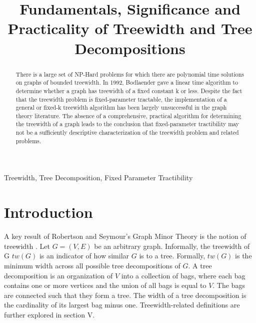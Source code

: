 \documentclass[12pt,conference]{IEEEtran}
\theoremstyle{plain}
\begin{document}
\raggedbottom

\title{Fundamentals, Significance and Practicality of Treewidth and Tree Decompositions}

\author{
}

\maketitle

\begin{abstract}
There is a large set of NP-Hard problems for which there are polynomial time solutions on graphs of bounded treewidth. In 1992, Bodlaender gave a linear time algorithm to determine whether a graph has treewidth of a fixed constant k or less. Despite the fact that the treewidth problem is fixed-parameter tractable, the implementation of a general or fixed-k treewidth algorithm has been largely unsuccessful in the graph theory literature. The absence of a comprehensive, practical algorithm for determining the treewidth of a graph leads to the conclusion that fixed-parameter tractibility may not be a sufficiently descriptive characterization of the treewidth problem and related problems.
\end{abstract}

\begin{IEEEkeywords}
Treewidth, Tree Decomposition, Fixed Parameter Tractibility
\end{IEEEkeywords}

\IEEEpeerreviewmaketitle

\section{Introduction}
A key result of Robertson and Seymour's Graph Minor Theory is the notion of treewidth \cite{treewidth-rob-seymour}. Let $G = (V,E)$ be an arbitrary graph. Informally, the treewidth of G $tw(G)$ is an indicator of how similar $G$ is to a tree. Formally, $tw(G)$ is the minimum width across all possible tree decompositions of $G$. A tree decomposition is an organization of $V$ into a collection of bags, where each bag contains one or more vertices and the union of all bags is equal to $V$. The bags are connected such that they form a tree. The width of a tree decomposition is the cardinality of its largest bag minus one. Treewidth-related definitions are further explored in section V.
\end{document}

